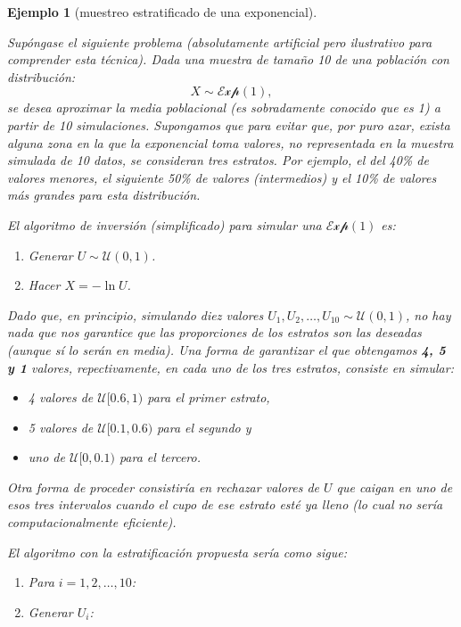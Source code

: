 \documentclass[
  spanish,
  10pt,
]{book}
\theoremstyle{break}
\newtheorem{example}{Ejemplo}[chapter]
\theoremstyle{nonumberplain}
\begin{document}
\begin{example}[muestreo estratificado de una exponencial]
\protect\hypertarget{exm:estr-exp}{}\label{exm:estr-exp}

Supóngase el siguiente problema (absolutamente artificial pero ilustrativo para comprender esta técnica).
Dada una muestra de tamaño 10 de una población con distribución:
\[X \sim \mathcal{Exp}\left( 1 \right),\]
se desea aproximar la media poblacional (es sobradamente conocido que es 1) a partir de 10 simulaciones.
Supongamos que para evitar que, por puro azar, exista alguna zona en la que la exponencial toma valores, no representada en la muestra simulada de 10 datos, se consideran tres estratos.
Por ejemplo, el del 40\% de valores menores, el siguiente 50\% de valores (intermedios) y el 10\% de valores más grandes para esta distribución.

El algoritmo de inversión (simplificado) para simular una \(\mathcal{Exp}\left(1\right)\) es:

\begin{enumerate}
\def\labelenumi{\arabic{enumi}.}
\item
  Generar \(U\sim \mathcal{U}\left(  0,1\right)\).
\item
  Hacer \(X=-\ln U\).
\end{enumerate}

Dado que, en principio, simulando diez valores \(U_{1},U_{2},\ldots,U_{10}\sim \mathcal{U}\left(  0,1\right)\), no hay nada que nos garantice que las proporciones de los estratos son las deseadas (aunque sí lo serán en media).
Una forma de garantizar el que obtengamos \textbf{4, 5 y 1} valores, repectivamente, en cada uno de los tres estratos, consiste en simular:

\begin{itemize}
\item
  4 valores de \(\mathcal{U}[0.6,1)\) para el primer estrato,
\item
  5 valores de \(\mathcal{U}[0.1,0.6)\) para el segundo y
\item
  uno de \(\mathcal{U}[0,0.1)\) para el tercero.
\end{itemize}

Otra forma de proceder consistiría en rechazar valores de \(U\) que caigan en uno de esos tres intervalos cuando el cupo de ese estrato esté ya lleno (lo cual no sería computacionalmente eficiente).

El algoritmo con la estratificación propuesta sería como sigue:

\begin{enumerate}
\def\labelenumi{\arabic{enumi}.}
\item
  Para \(i=1,2,\ldots, 10\):
\item
  Generar \(U_{i}\):


\end{enumerate}
\end{example}
\end{document}
